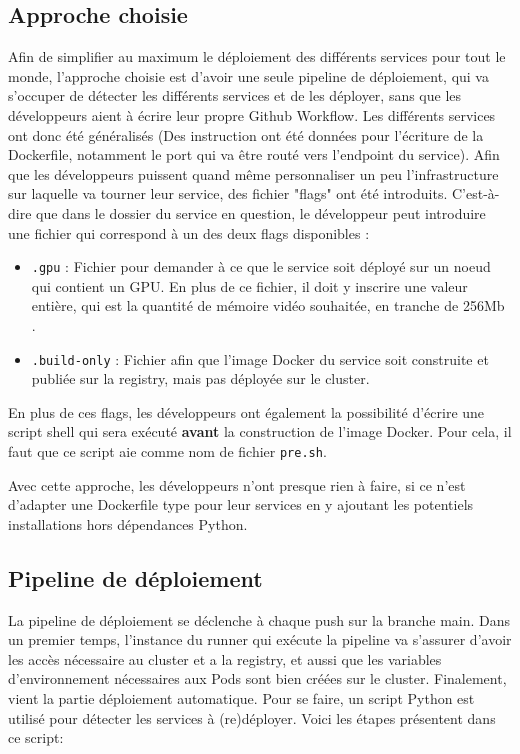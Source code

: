 \subsection{Approche choisie}
Afin de simplifier au maximum le déploiement des différents services pour tout le monde, l'approche choisie est d'avoir une seule pipeline de déploiement, qui va s'occuper de détecter les différents services et de les déployer, sans que les développeurs aient à écrire leur propre Github Workflow. Les différents services ont donc été généralisés (Des instruction ont été données pour l'écriture de la Dockerfile, notamment le port qui va être routé vers l'endpoint du service). Afin que les développeurs puissent quand même personnaliser un peu l'infrastructure sur laquelle va tourner leur service, des fichier "flags" ont été introduits. C'est-à-dire que dans le dossier du service en question, le développeur peut introduire une fichier qui correspond à un des deux flags disponibles :

\begin{itemize}
    \item \verb|.gpu| :  Fichier pour demander à ce que le service soit déployé sur un noeud qui contient un GPU. En plus de ce fichier, il doit y inscrire une valeur entière, qui est la quantité de mémoire vidéo souhaitée, en tranche de 256Mb \cite{k8s_gpu}.
    \item \verb|.build-only| :  Fichier afin que l'image Docker du service soit construite et publiée sur la registry, mais pas déployée sur le cluster.
\end{itemize}

En plus de ces flags, les développeurs ont également la possibilité d'écrire une script shell qui sera exécuté \textbf{avant} la construction de l'image Docker. Pour cela, il faut que ce script aie comme nom de fichier \verb|pre.sh|.

Avec cette approche, les développeurs n'ont presque rien à faire, si ce n'est d'adapter une Dockerfile type pour leur services en y ajoutant les potentiels installations hors dépendances Python.


\subsection{Pipeline de déploiement}
La pipeline de déploiement se déclenche à chaque push sur la branche main. Dans un premier temps, l'instance du runner qui exécute la pipeline va s'assurer d'avoir les accès nécessaire au cluster et a la registry, et aussi que les variables d'environnement nécessaires aux Pods sont bien créées sur le cluster. Finalement, vient la partie déploiement automatique. Pour se faire, un script Python est utilisé pour détecter les services à (re)déployer. Voici les étapes présentent dans ce script: 

